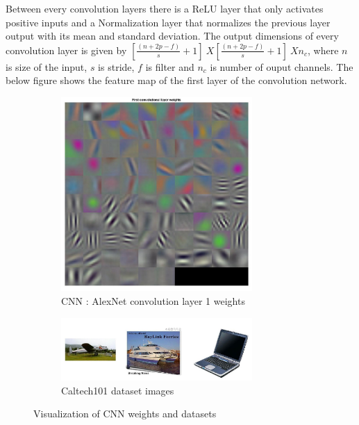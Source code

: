 Between every convolution layers there is a ReLU layer that only activates positive inputs and a Normalization  layer that normalizes the previous layer output with its mean and standard  deviation. The output dimensions of every convolution layer is given by  $[\frac{(n+2p-f)}{s}+1] \ X [\frac{(n+2p-f)}{s}+1] \ X n_c$, where $n$ is size of the input, $s$ is stride, $f$ is filter and $n_c$ is number of ouput channels. The below figure shows the feature map of the first layer of the convolution network.
\begin{figure}[!htpb]
	\centering
	\begin{subfigure}[b]{0.5\textwidth}
		\centering
		\captionsetup{width=1\linewidth, format = hang}
		\includegraphics[height = 0.6\textwidth,width = 0.8\textwidth]{Exercise3/Report/conv1}
		\caption{CNN : AlexNet convolution layer 1 weights }\label{fig:conv1}
	\end{subfigure}%
	\begin{subfigure}[b]{0.5\textwidth}
		\centering
		\captionsetup{width=0.8\linewidth, format = hang}
		\includegraphics[height = 0.5\textwidth,width = 0.8\textwidth]{Exercise3/Report/conv2}
		\caption{Caltech101 dataset images}\label{fig:conv2}
	\end{subfigure}%
	\caption{ Visualization of CNN weights and datasets}
	\label{fig:cnn}
\end{figure}
